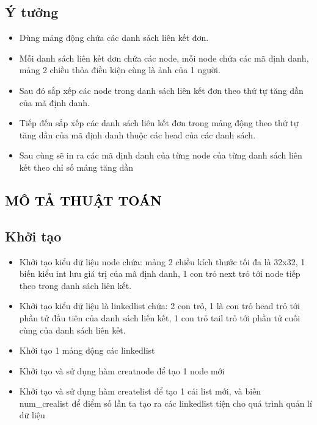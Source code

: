\documentclass [14pt, a4paper]{report}
\begin{document}
\section{Ý tưởng}
\begin{itemize}
\fontsize{13}{18}\selectfont
  \item Dùng mảng động chứa các danh sách liên kết đơn.
  \item Mỗi danh sách liên kết đơn chứa các node, mỗi node chứa các mã định danh, mảng 2 chiều thỏa điều kiện cùng là ảnh của 1 người. 
    \item Sau đó sắp xếp các node trong danh sách liên kết đơn theo thứ tự tăng dần của mã định danh. 
    \item Tiếp đến sắp xếp các danh sách liên kết đơn trong mảng động theo thứ tự tăng dần của mã định danh thuộc các head của các danh sách.
    \item Sau cùng sẽ in ra các mã định danh của từng node của từng danh sách liên kết theo chỉ số mảng tăng dần
\end{itemize}


\textcolor{black}{\chapter{MÔ TẢ THUẬT TOÁN} }
\section{Khởi tạo}
\begin{itemize}
\fontsize{13}{18}\selectfont

  \item Khởi tạo kiểu dữ liệu node chứa: mảng 2 chiều kích thước tối đa là 32x32, 1 biến kiểu int lưu giá trị của mã định danh, 1 con trỏ next trỏ tới node tiếp theo trong danh sách liên kết.
  \item Khởi tạo kiểu dữ liệu là linkedlist chứa: 2 con trỏ, 1 là con trỏ head trỏ tới phần tử đầu tiên của danh sách liến kết, 1 con trỏ tail trỏ tới phần tử cuối cùng của danh sách liên kết.
    \item  Khởi tạo 1 mảng động các linkedlist
    \item  Khởi tạo và sử dụng hàm creatnode để tạo 1 node mới
    \item  Khởi tạo và sử dụng hàm createlist để tạo 1 cái list mới, và biến num\_crealist để điểm số lần ta tạo ra các linkedlist tiện cho quá trình quản lí dữ liệu
   
\end{itemize}
\end{document}
